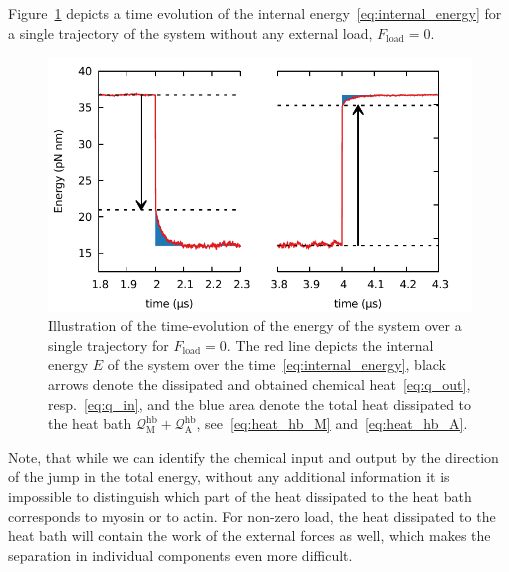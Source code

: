 \documentclass[aps,pre,twocolumn,showpacs,showkeys,superscriptaddress,floatfix]{revtex4-1}
\begin{document}
Figure~\ref{fig:energy_evolution} depicts a time evolution of the internal energy~\eqref{eq:internal_energy} for a single trajectory of the system without any external load, $F_\text{load} = 0$.
\begin{figure}
\centering
\includegraphics[width=.45\textwidth,height=!]{energy_1head.pdf}
\caption{\label{fig:energy_evolution}
Illustration of the time-evolution of the energy of the system over a single trajectory for $F_\text{load} = 0$.
The red line depicts the internal energy $E$ of the system over the time~\eqref{eq:internal_energy},
black arrows denote the dissipated and obtained chemical heat~\eqref{eq:q_out}, resp.~\eqref{eq:q_in},
and the blue area denote the total heat dissipated to the heat bath ${\mathcal Q}_\text{M}^\text{hb} + {\mathcal Q}_\text{A}^\text{hb}$, 
see~\eqref{eq:heat_hb_M} and~\eqref{eq:heat_hb_A}.
}
\end{figure}
Note, that while we can identify the chemical input and output by the direction of the jump in the total energy, 
without any additional information it is impossible to distinguish which part of the heat dissipated to the heat bath corresponds to myosin or to actin.
For non-zero load, the heat dissipated to the heat bath will contain the work of the external forces as well,
which makes the separation in individual components even more difficult.
\end{document}
